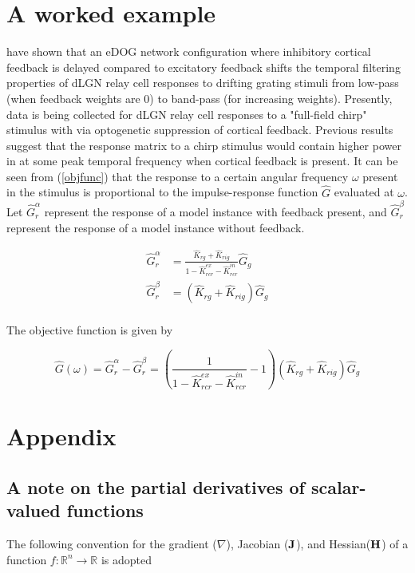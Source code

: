\documentclass{article}
\newcommand{\R}{\mathbb{R}}
\newcommand{\vect}[1]{\textbf{\textrm{#1}}}
\begin{document}
\section{A worked example}
\cite{mobarhan2018} have shown that an eDOG network configuration where inhibitory cortical feedback is delayed compared to excitatory feedback shifts the temporal filtering properties of dLGN relay cell responses to drifting grating stimuli from low-pass (when feedback weights are 0) to band-pass (for increasing weights). Presently, data is being collected for dLGN relay cell responses to a "full-field chirp" stimulus with via optogenetic suppression of cortical feedback. Previous results \citep{mobarhan2018} suggest that the response matrix to a chirp stimulus would contain higher power in at some peak temporal frequency when cortical feedback is present. It can be seen from (\ref{objfunc}) that the response to a certain angular frequency $\omega$ present in the stimulus is proportional to the impulse-response function $\hat{G}$ evaluated at $\omega$. Let $\hat{G}_r^\alpha$ represent the response of a model instance with feedback present, and $\hat{G}_r^\beta$ represent the response of a model instance without feedback.

\begin{align*}
	\hat{G}_r^\alpha & = \frac{\hat{K}_{rg} + \hat{K}_{rig}}
					   {1 - \hat{K}_{rcr}^{ex} - \hat{K}_{rcr}^{in}} \hat{G}_g \\
	\hat{G}_r^\beta & = \left( \hat{K}_{rg} + \hat{K}_{rig} \right) \hat{G}_g \\
\end{align*}

The objective function is given by

\begin{equation}
	\hat{G}(\omega) = \hat{G}_r^\alpha - \hat{G}_r^\beta = 
	\left( \frac{1}{1 - \hat{K}_{rcr}^{ex} - \hat{K}_{rcr}^{in}} - 1 \right)
	\left( \hat{K}_{rg} + \hat{K}_{rig} \right) \hat{G}_g
\end{equation}

\yel{[...]}

\section{Appendix} \label{appendix}

\subsection{A note on the partial derivatives of scalar-valued functions}
The following convention for the gradient ($\nabla$), Jacobian ($\vect{J}$), and Hessian($\vect{H}$) of a function $f: \R^n \rightarrow \R$ is adopted
\end{document}
